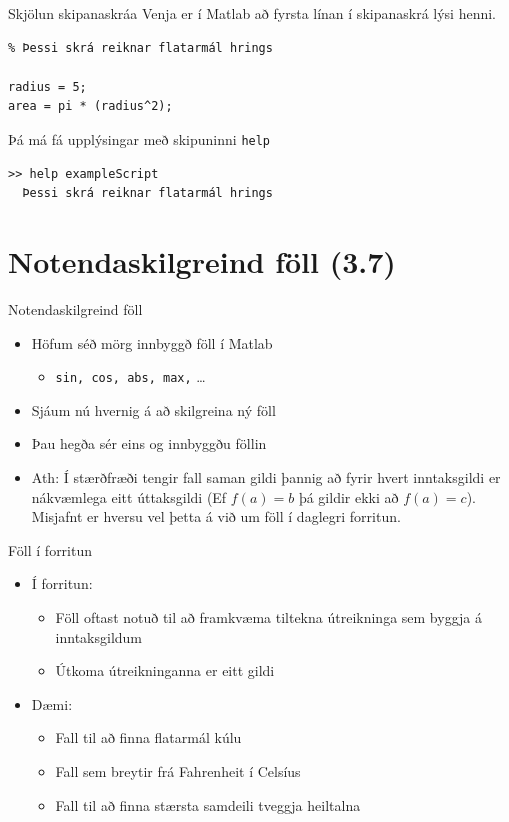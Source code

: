 \documentclass{beamer}
\begin{document}
\begin{frame}[fragile]{Skjölun skipanaskráa}
\vspace{\baselineskip}
Venja er í Matlab að fyrsta línan í skipanaskrá lýsi henni.
\begin{verbatim}
% Þessi skrá reiknar flatarmál hrings

radius = 5;
area = pi * (radius^2);
\end{verbatim}
Þá má fá upplýsingar með skipuninni \texttt{help}
\begin{verbatim}
>> help exampleScript
  Þessi skrá reiknar flatarmál hrings
\end{verbatim}
\end{frame}

\section{Notendaskilgreind föll (3.7)}

\begin{frame}{Notendaskilgreind föll}
\begin{itemize}
 \item Höfum séð mörg innbyggð föll í Matlab
 \begin{itemize}
  \item \texttt{sin, cos, abs, max,} \ldots
 \end{itemize}
 \item Sjáum nú hvernig á að skilgreina ný föll
 \item Þau hegða sér eins og innbyggðu föllin
 \item Ath: Í stærðfræði tengir fall saman gildi þannig að fyrir hvert inntaksgildi er nákvæmlega eitt úttaksgildi (Ef $f(a) = b$ þá gildir ekki að $f(a) = c$). Misjafnt er hversu vel þetta á við um föll í daglegri forritun.
\end{itemize}
\end{frame}

\begin{frame}{Föll í forritun}
\begin{itemize}
 \item Í forritun:
 \begin{itemize}
  \item Föll oftast notuð til að framkvæma tiltekna útreikninga sem byggja á inntaksgildum
  \item Útkoma útreikninganna er eitt gildi
 \end{itemize}
 \item Dæmi:
 \begin{itemize}
  \item Fall til að finna flatarmál kúlu
  \item Fall sem breytir frá Fahrenheit í Celsíus
  \item Fall til að finna stærsta samdeili tveggja heiltalna
 \end{itemize}
\end{itemize}
\end{frame}
\end{document}
